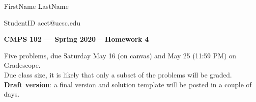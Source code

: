 \documentclass[11pt]{article}
\begin{document}
\hfill FirstName  LastName  

\hfill StudentID  acct@ucsc.edu

\begin{center}
{\bf\Large 
CMPS 102 --- Spring 2020 --  Homework 4  %
}
\end{center}

\begin{center}
Five problems,  due Saturday May 16 (on canvas) and May 25 (11:59 PM) on Gradescope.  \\
Due class size, it is likely that only a subset of the problems will be graded. \\
\textbf{Draft version}: a final version and solution template will be posted in a couple of days.
\end{center}



\medskip

\renewcommand{\P}{\mbox{IH}}
\end{document}
